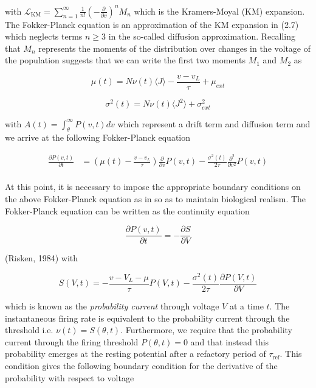 \documentclass{ucetd}
\begin{document}
with $ \mathcal{L}_{\mathrm{KM}} =\sum_{n=1}^{\infty} \frac{1}{n!}\left(-\frac{\partial}{\partial v}\right)^{n} M_{n}$  which is the Kramers-Moyal (KM) expansion. The Fokker-Planck equation is an approximation of the KM expansion in (2.7) which neglects terms $n\geq 3$ in the so-called diffusion approximation. Recalling that $M_{n}$ represents the moments of the distribution over changes in the voltage of the population suggests that we can write the first two moments $M_{1}$ and $M_{2}$ as

\begin{equation*}
\mu(t) = N\nu(t)\langle J\rangle - \frac{v-v_{L}}{\tau} + \mu_{ext}
\end{equation*}

\begin{equation*}
\sigma^{2}(t) = N\nu(t)\langle J^{2}\rangle + \sigma_{ext}^{2}
\end{equation*}

with $A(t) = \int_{\theta}^{\infty} P(v,t)dv$ which represent a drift term and diffusion term and we arrive at the following Fokker-Planck equation

\begin{align*}
\frac{\partial P(v,t)}{\partial t} &= \left(\mu(t) - \frac{v-v_{L}}{\tau}\right) \frac{\partial}{\partial v} P(v,t) - \frac{\sigma^{2}(t)}{2\tau}\frac{\partial^{2}}{\partial v^{2}} P(v,t)\\
\end{align*} 

At this point, it is necessary to impose the appropriate boundary conditions on the above Fokker-Planck equation as in so as to maintain biological realism. The Fokker-Planck equation can be written as the continuity equation 

\begin{equation*}
\frac{\partial P(v,t)}{\partial t} = -\frac{\partial S}{\partial V}
\end{equation*}

(Risken, 1984) with 

\begin{equation*}
S(V,t) = -\frac{v-V_{L}-\mu}{\tau}P(V,t) - \frac{\sigma^{2}(t)}{2\tau}\frac{\partial P(V,t)}{\partial V}
\end{equation*}

which is known as the \emph{probability current} through voltage $V$ at a time $t$. The instantaneous firing rate is equivalent to the probability current through the threshold i.e. $\nu(t) = S(\theta,t)$. Furthermore, we require that the probability current through the firing threshold $P(\theta, t)=0$ and that instead this probability emerges at the resting potential after a refactory period of $\tau_{\mathrm{ref}}$. This condition gives the following boundary condition for the derivative of the probability with respect to voltage
\end{document}
